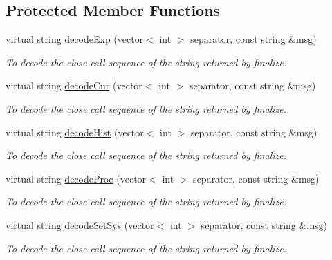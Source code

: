 \subsection*{Protected Member Functions}
\begin{DoxyCompactItemize}
\item 
virtual string \hyperlink{classIMSMapper_afdc6bd11992d07d732ba1399d901a63a}{decodeExp} (vector$<$ int $>$ separator, const string \&msg)
\begin{DoxyCompactList}\small\item\em To decode the close call sequence of the string returned by finalize. \item\end{DoxyCompactList}\item 
virtual string \hyperlink{classIMSMapper_ae8b518766957d35ee20737cd2dde4fec}{decodeCur} (vector$<$ int $>$ separator, const string \&msg)
\begin{DoxyCompactList}\small\item\em To decode the close call sequence of the string returned by finalize. \item\end{DoxyCompactList}\item 
virtual string \hyperlink{classIMSMapper_a0ee71a02e2de7ce08a45f413590cd3b8}{decodeHist} (vector$<$ int $>$ separator, const string \&msg)
\begin{DoxyCompactList}\small\item\em To decode the close call sequence of the string returned by finalize. \item\end{DoxyCompactList}\item 
virtual string \hyperlink{classIMSMapper_a61c1a3d5d5ac306ddb86925a1777b568}{decodeProc} (vector$<$ int $>$ separator, const string \&msg)
\begin{DoxyCompactList}\small\item\em To decode the close call sequence of the string returned by finalize. \item\end{DoxyCompactList}\item 
virtual string \hyperlink{classIMSMapper_a5d0d0531f0dc64f2186021b57375419b}{decodeSetSys} (vector$<$ int $>$ separator, const string \&msg)
\begin{DoxyCompactList}\small\item\em To decode the close call sequence of the string returned by finalize. \item\end{DoxyCompactList}\item 

\end{DoxyCompactItemize}
